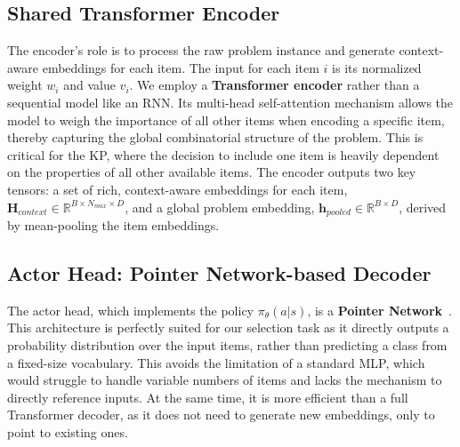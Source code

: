 \subsection{Shared Transformer Encoder}
The encoder's role is to process the raw problem instance and generate context-aware embeddings for each item. The input for each item \(i\) is its normalized weight \(w_i\) and value \(v_i\). We employ a \textbf{Transformer encoder} rather than a sequential model like an RNN. Its multi-head self-attention mechanism allows the model to weigh the importance of all other items when encoding a specific item, thereby capturing the global combinatorial structure of the problem. This is critical for the KP, where the decision to include one item is heavily dependent on the properties of all other available items. The encoder outputs two key tensors: a set of rich, context-aware embeddings for each item, \(\mathbf{H}_{context} \in \mathbb{R}^{B \times N_{max} \times D}\), and a global problem embedding, \(\mathbf{h}_{pooled} \in \mathbb{R}^{B \times D}\), derived by mean-pooling the item embeddings.

\subsection{Actor Head: Pointer Network-based Decoder}
The actor head, which implements the policy \(\pi_\theta(a|s)\), is a \textbf{Pointer Network}~\cite{vinyalsPointerNetworks2015}. This architecture is perfectly suited for our selection task as it directly outputs a probability distribution over the input items, rather than predicting a class from a fixed-size vocabulary. This avoids the limitation of a standard MLP, which would struggle to handle variable numbers of items and lacks the mechanism to directly reference inputs. At the same time, it is more efficient than a full Transformer decoder, as it does not need to generate new embeddings, only to point to existing ones.

